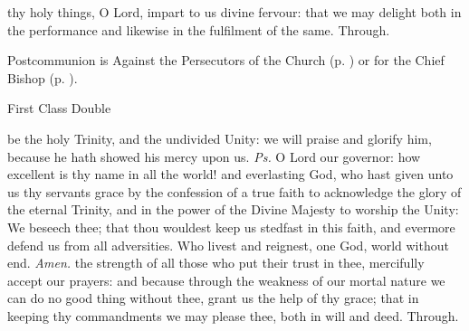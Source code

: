 
\postcommunion
{} thy holy things, O Lord, impart to us divine fervour: that we may delight both in the performance and likewise in the fulfilment of the same. Through.
\begin{rubric}
     Postcommunion is Against the Persecutors of the Church (p. \pageref{SPAgainst}) or for the Chief Bishop (p. \pageref{SPChiefBishop}).
\end{rubric}


\begin{inhead}
    {First Class Double}
\end{inhead}
\fancyhead[RE,LO]{}

\properantiphonfix

\introit
{} be the holy Trinity, and the undivided Unity: we will praise and glorify him, because he hath showed his mercy upon us. \textit{Ps.} O Lord our governor: how excellent is thy name in all the world!
\collect
{} and everlasting God, who hast given unto us thy servants grace by the confession of a true faith to acknowledge the glory of the eternal Trinity, and in the power of the Divine Majesty to worship the Unity: We beseech thee; that thou wouldest keep us stedfast in this faith, and evermore defend us from all adversities. Who livest and reignest, one God, world without end. \textit{Amen.}
 the strength of all those who put their trust in thee, mercifully accept our prayers: and because through the weakness of our mortal nature we can do no good thing without thee, grant us the help of thy grace; that in keeping thy commandments we may please thee, both in will and deed. Through.

\vspace{-1ex}

